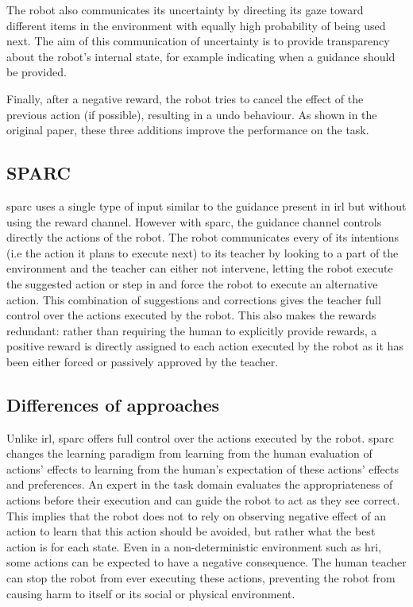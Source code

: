 The robot also communicates its uncertainty by directing its gaze toward different items in the environment with equally high probability of being used next. The aim of this communication of uncertainty is to provide transparency about the robot's internal state, for example indicating when a guidance should be provided. 

Finally, after a negative reward, the robot tries to cancel the effect of the previous action (if possible), resulting in a undo behaviour. As shown in the original paper, these three additions improve the performance on the task.

\subsection{SPARC}

\gls{sparc} uses a single type of input similar to the guidance present in \gls{irl} but without using the reward channel. However with \gls{sparc}, the guidance channel controls directly the actions of the robot. The robot communicates every of its intentions (i.e the action it plans to execute next) to its teacher by looking to a part of the environment and the teacher can either not intervene, letting the robot execute the suggested action or step in and force the robot to execute an alternative action. This combination of suggestions and corrections gives the teacher full control over the actions executed by the robot. This also makes the rewards redundant: rather than requiring the human to explicitly provide rewards, a positive reward is directly assigned to each action executed by the robot as it has been either forced or passively approved by the teacher.

\subsection{Differences of approaches}

Unlike \gls{irl}, \gls{sparc} offers full control over the actions executed by the robot. \gls{sparc} changes the learning paradigm from learning from the human evaluation of actions' effects to learning from the human's expectation of these actions' effects and preferences. An expert in the task domain evaluates the appropriateness of actions before their execution and can guide the robot to act as they see correct. This implies that the robot does not to rely on observing negative effect of an action to learn that this action should be avoided, but rather what the best action is for each state. Even in a non-deterministic environment such as \gls{hri}, some actions can be expected to have a negative consequence. The human teacher can stop the robot from ever executing these actions, preventing the robot from causing harm to itself or its social or physical environment. 

